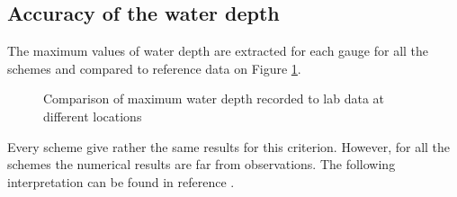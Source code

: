 \subsection{Accuracy of the water depth}

The maximum values of water depth are extracted for each gauge for all the
schemes and compared to reference data on Figure \ref{tab:malpasset:max}.

\begin{figure}[H]
\begin{minipage}[t]{0.5\textwidth}
 \centering
\end{minipage}%
\begin{minipage}[t]{0.5\textwidth}
 \centering
\end{minipage}
\begin{minipage}[t]{0.5\textwidth}
 \centering
\end{minipage}%
\begin{minipage}[t]{0.5\textwidth}
 \centering
\end{minipage}
\begin{minipage}[t]{0.5\textwidth}
 \centering
\end{minipage}%
\begin{minipage}[t]{0.5\textwidth}
 \centering
\end{minipage}
  \caption{Comparison of maximum water depth recorded to lab data at different locations}\label{tab:malpasset:max}
\end{figure}

Every scheme give rather the same results for this criterion.
However, for all the schemes the numerical results are far from observations.
The following interpretation can be found in reference \cite{Hervouet2007}.\\

